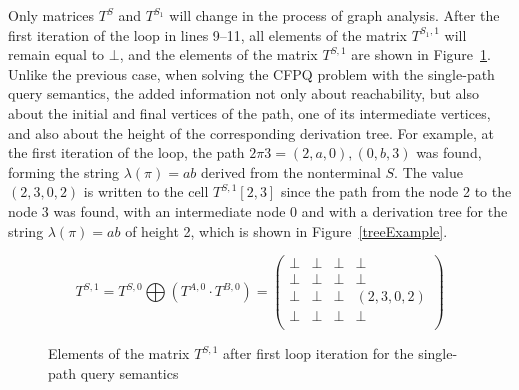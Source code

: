 Only matrices $T^{S}$ and $T^{S_1}$ will change in the process of graph analysis. After the first iteration of the loop in lines 9--11, all elements of the matrix $T^{S_1, 1}$ will remain equal to $\bot$, and the elements of the matrix $T^{S, 1}$ are shown in Figure~\ref{ExampleQueryFirstIterationSingle}. Unlike the previous case, when solving the CFPQ problem with the single-path query semantics, the added information not only about reachability, but also about the initial and final vertices of the path, one of its intermediate vertices, and also about the height of the corresponding derivation tree. For example, at the first iteration of the loop, the path $2 \pi 3 = (2, a, 0), (0, b, 3)$ was found, forming the string $\lambda(\pi) = ab$ derived from the nonterminal $S$. The value $(2, 3, 0, 2)$ is written to the cell $T^{S, 1}[2, 3]$ since the path from the node 2 to the node 3 was found, with an intermediate node 0 and with a derivation tree for the string $\lambda(\pi) = ab$ of height 2, which is shown in Figure~\ref{treeExample}.

{\footnotesize
\begin{figure}[h]
	\[
	T^{S,1} = T^{S, 0} \bigoplus (T^{A, 0} \cdot T^{B, 0}) = \begin{pmatrix}
	\bot & \bot       & \bot & \bot       \\
	\bot & \bot & \bot       & \bot \\
	\bot       & \bot & \bot & (2, 3, 0, 2) \\
	\bot       & \bot & \bot & \bot \\
	\end{pmatrix}
	\]
	\caption{Elements of the matrix $T^{S, 1}$ after first loop iteration for the single-path query semantics}
	\label{ExampleQueryFirstIterationSingle}
\end{figure}
}

